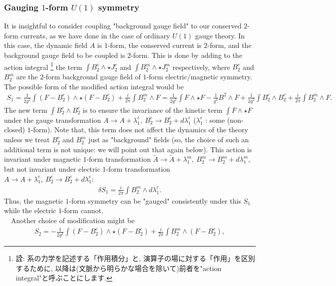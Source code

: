 \documentclass{ltjsarticle}
\theoremstyle{mystyle} %
\numberwithin{equation}{section}
\begin{document}
 \subsubsection{Gauging $1$-form $U(1)$ symmetry}
 It is insightful to consider coupling "background gauge field" to our conserved $2$-form currents, as we have done in the case of ordinary $U(1)$ gauge theory. 
 In this case, the dynamic field $A$ is $1$-form, the conserved current is $2$-form, and the background gauge field to be coupled is $2$-form. 
 This is done by adding to the action integral
\footnote{詮: 系の力学を記述する「作用積分」と, 演算子の場に対する「作用」を区別するために, 以降は(文脈から明らかな場合を除いて)前者を"action integral"と呼ぶことにします. }
 the term $\int B^e_2\wedge \star J^e_2$ and $\int B^m_2\wedge \star J^m_2$ respectively, 
where $B^e_2$ and $B^m_2$ are the $2$-form background gauge field of $1$-form electric/magnetic symmetry.  
The possible form of the modified action integral would be 
\begin{align}
    S_1=\frac{1}{2g^2}\int (F-B^e_2)\wedge \star (F-B^e_2) 
    +\frac{i}{2\pi}\int B^m_2 \wedge F
    =\frac{1}{2g^2}\int F\wedge \star F -\frac{1}{g^2} B^2 \wedge F
    +\frac{1}{2g^2}\int B^e_2\wedge B^e_2 + 
    \frac{i}{2\pi}\int B^m_2\wedge F. 
\label{Gauging1formSym}
\end{align}
The new term $\int B^e_2\wedge B^e_2$ is to ensure the invariance of the kinetic term $\int F\wedge \star F$
under the gauge transformation $A\to A+ \lambda^e_1,~ B^e_{2}\to B^e_2 + d\lambda^e_1$ ($\lambda^e_1$ : some (non-closed) $1$-form). 
Note that, this term does not affect the dynamics of the theory unless we treat $B^e_2$ and $B^m_2$ just as "background" fields 
(so, the choice of such an additional term is not unique: we will point out that again below). 
This action is invariant under magnetic $1$-form transformation $\tilde{A} \to \tilde{A}+\lambda^{m}_1, ~B^m_2\to B^m_2 + d\lambda^m_1$, 
but not invariant under electric $1$-form transformation $A\to A+ \lambda^e_1,~ B^e_{2}\to B^e_2 + d\lambda^e_1$: 
\begin{align}
    \delta S_1 = \frac{i}{2\pi}\int B^m_2\wedge d\lambda^e_1. 
    \label{eleAno}
\end{align}
Thus, the magnetic $1$-form symmetry can be "gauged" consistently under this $S_1$ while the electric $1$-form cannot. \\
　Another choice of modification might be
\begin{align}
    S_2 = -\frac{1}{2g^2}\int (F-B^e_2)\wedge \star (F-B^e_2)
    +\frac{i}{2\pi}\int B^m_2\wedge(F-B^e_2), 
\end{align}
\end{document}
